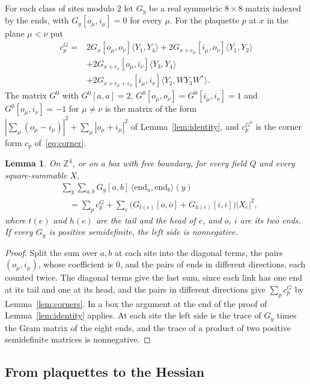 \documentclass[11pt]{amsart}
\newtheorem{lemma}[theorem]{Lemma}
\theoremstyle{definition}
\theoremstyle{remark}
\numberwithin{equation}{section}
\newcommand{\Z}{\mathbb{Z}}
\newcommand{\ip}[2]{\langle #1,#2\rangle}
\begin{document}
For each class of sites modulo $2$ let $G_y$ be a real symmetric $8\times8$
matrix indexed by the ends, with $G_y[o_\mu,i_\mu]=0$ for every $\mu$. For
the plaquette $p$ at $x$ in the plane $\mu<\nu$ put
\[
\begin{split}
c^G_p={}&2G_x[o_\mu,o_\nu]\ip{Y_1}{Y_4}
+2G_{x+e_\mu}[i_\mu,o_\nu]\ip{Y_1}{Y_2}\\
&+2G_{x+e_\nu}[o_\mu,i_\nu]\ip{Y_3}{Y_4}\\
&+2G_{x+e_\mu+e_\nu}[i_\mu,i_\nu]\ip{Y_2}{WY_3W^*}.
\end{split}
\]
The matrix $G^0$ with $G^0[a,a]=2$, $G^0[o_\mu,o_\nu]=G^0[i_\mu,i_\nu]=1$
and $G^0[o_\mu,i_\nu]=-1$ for $\mu\ne\nu$ is the matrix of the form
$|\sum_\mu(o_\mu-i_\mu)|^2+\sum_\mu|o_\mu+i_\mu|^2$ of
Lemma~\ref{lem:identity}, and $c^{G^0}_p$ is the corner form
$c_p$ of~\eqref{eq:corner}.

\begin{lemma}\label{lem:siteidentity}
On $\Z^4$, or on a box with free boundary, for every field $Q$ and every
square-summable $X$,
\[
\begin{split}
&\sum_y\sum_{a,b}G_y[a,b]\,\ip{\mathrm{end}_a}{\mathrm{end}_b}(y)\\
&\quad=\sum_pc^G_p+\sum_e\bigl(G_{t(e)}[o,o]+G_{h(e)}[i,i]\bigr)|X_e|^2,
\end{split}
\]
where $t(e)$ and $h(e)$ are the tail and the head of $e$, and $o$, $i$ are
its two ends. If every $G_y$ is positive semidefinite, the left side is
nonnegative.
\end{lemma}

\begin{proof}
Split the sum over $a,b$ at each site into the diagonal terms, the pairs
$(o_\mu,i_\mu)$, whose coefficient is $0$, and the pairs of ends in
different directions, each counted twice. The diagonal terms give the last
sum, since each link has one end at its tail and one at its head, and the
pairs in different directions give $\sum_pc^G_p$ by
Lemma~\ref{lem:corners}. In a box the argument at the end of the proof of
Lemma~\ref{lem:identity} applies. At each site the left side is the trace of
$G_y$ times the Gram matrix of the eight ends, and the trace of a product of
two positive semidefinite matrices is nonnegative.
\end{proof}

\subsection{From plaquettes to the Hessian}
\end{document}
